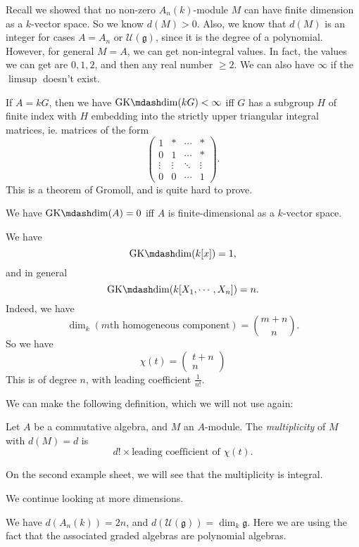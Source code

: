 \documentclass[a4paper]{article}
\newcommand\GKdim{\mathrm{GK}\mdash\mathrm{dim}}
\begin{document}
Recall we showed that no non-zero $A_n(k)$-module $M$ can have finite dimension as a $k$-vector space. So we know $d(M) > 0$. Also, we know that $d(M)$ is an integer for cases $A = A_n$ or $\mathcal{U}(\mathfrak{g})$, since it is the degree of a polynomial. However, for general $M = A$, we can get non-integral values. In fact, the values we can get are $0, 1, 2$, and then any real number $\geq 2$. We can also have $\infty$ if the $\limsup$ doesn't exist.

\begin{eg}
  If $A = kG$, then we have $\GKdim(kG) < \infty$ iff $G$ has a subgroup $H$ of finite index with $H$ embedding into the strictly upper triangular integral matrices, ie. matrices of the form
  \[
    \begin{pmatrix}
      1 & * & \cdots & *\\
      0 & 1 & \cdots & *\\
      \vdots & \vdots & \ddots & \vdots\\
      0 & 0 & \cdots & 1
    \end{pmatrix}.
  \]
  This is a theorem of Gromoll, and is quite hard to prove.
\end{eg}

\begin{eg}
  We have $\GKdim(A)= 0$ iff $A$ is finite-dimensional as a $k$-vector space.

  We have
  \[
    \GKdim(k[x]) = 1,
  \]
  and in general
  \[
    \GKdim(k[X_1, \cdots, X_n]) = n.
  \]
  Indeed, we have
  \[
    \dim_k(\text{$m$th homogeneous component}) = \binom{m + n}{n}.
  \]
  So we have
  \[
    \chi(t) =
    \begin{pmatrix}
      t + n\\n
    \end{pmatrix}
  \]
  This is of degree $n$, with leading coefficient $\frac{1}{n!}$.
\end{eg}

We can make the following definition, which we will not use again:
\begin{defi}[Multiplicity]
  Let $A$ be a commutative algebra, and $M$ an $A$-module. The \emph{multiplicity} of $M$ with $d(M) = d$ is
  \[
    d! \times \text{leading coefficient of $\chi(t)$}.
  \]
\end{defi}
On the second example sheet, we will see that the multiplicity is integral.

We continue looking at more dimensions.
\begin{eg}
  We have $d(A_n(k)) = 2n$, and $d(\mathcal{U}(\mathfrak{g})) = \dim_k \mathfrak{g}$. Here we are using the fact that the associated graded algebras are polynomial algebras.
\end{eg}
\end{document}
